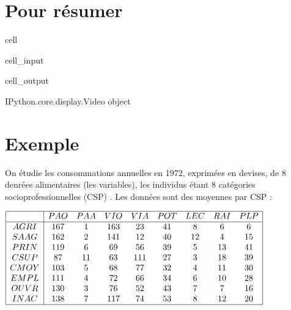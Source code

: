 \documentclass[letterpaper,10pt,french]{sphinxmanual}
\begin{document}
\section{Pour résumer}
\label{\detokenize{acp:pour-resumer}}
\begin{sphinxuseclass}{cell}
\begin{sphinxuseclass}{cell_input}
\begin{sphinxVerbatim}[commandchars=\\\{\}]
   
 
\end{sphinxVerbatim}

\end{sphinxuseclass}
\begin{sphinxuseclass}{cell_output}
\begin{sphinxVerbatim}[commandchars=\\\{\}]
\PYGZlt{}IPython.core.display.Video object\PYGZgt{}
\end{sphinxVerbatim}

\end{sphinxuseclass}
\end{sphinxuseclass}

\section{Exemple}
\label{\detokenize{acp:exemple}}
\sphinxAtStartPar
On étudie les consommations annuelles en 1972, exprimées en devises, de 8 denrées alimentaires (les variables), les individus étant 8 catégories socio\sphinxhyphen{}professionnelles (CSP) . Les données sont des moyennes par CSP :

\sphinxAtStartPar
\(
\begin{array}{|c|cccccccc|}
\hline
  &PAO  &PAA  &VIO& VIA&  POT&  LEC &RAI& PLP\\
\hline
AGRI  &167  &1  &163& 23& 41  &8& 6 &6\\
SAAG  &162& 2 &141& 12  &40 &12&  4&  15\\
PRIN  &119& 6 &69 &56 &39&  5 &13 &41\\
CSUP  &87 &11 &63 &111& 27& 3 &18 &39\\
CMOY  &103  &5  &68 &77 &32&  4 &11 &30\\
EMPL  &111  &4  &72 &66 &34&  6 &10 &28\\
OUVR  &130  &3  &76 &52 &43&  7 &7  &16\\
INAC  &138  &7  &117  &74&  53& 8 &12 &20\\
\hline
\end{array}
\)
\end{document}

